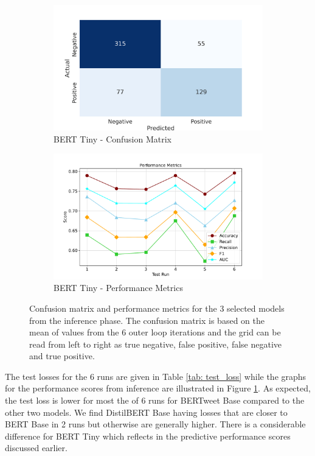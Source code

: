 \begin{figure}[!ht]
    \begin{subfigure}{0.45\linewidth}
        \includegraphics[width=\linewidth]{figures/confusion_berttiny.png}
        \caption{BERT Tiny - Confusion Matrix}
    \end{subfigure}
    \hfil
    \begin{subfigure}{0.45\linewidth}
        \includegraphics[width=\linewidth]{figures/metrics_line_berrttiny.pdf}
        \caption{BERT Tiny - Performance Metrics}
    \end{subfigure}
    \caption{Confusion matrix and performance metrics for the 3 selected models from the inference phase. The confusion matrix is based on the mean of values from the 6 outer loop iterations and the grid can be read from left to right as true negative, false positive, false negative and true positive.}
    \label{fig: deep_dive_results}
\end{figure}

The test losses for the 6 runs are given in Table \ref{tab: test_loss} while the graphs for the performance scores from inference are illustrated in Figure \ref{fig: deep_dive_results}. As expected, the test loss is lower for most the of 6 runs for BERTweet Base compared to the other two models. We find DistilBERT Base having losses that are closer to BERT Base in 2 runs but otherwise are generally higher. There is a considerable difference for BERT Tiny which reflects in the predictive performance scores discussed earlier. 


